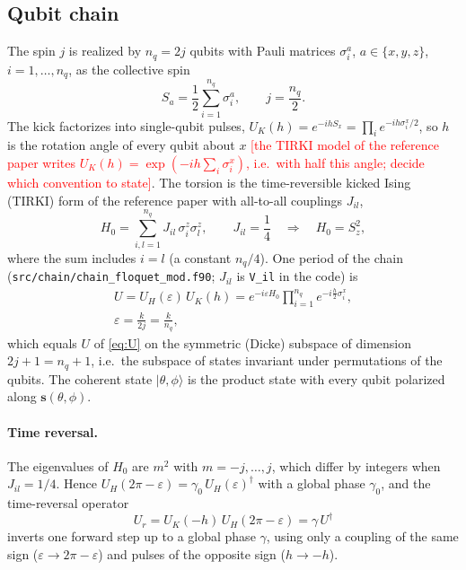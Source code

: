 \documentclass[aps,pra,twocolumn,superscriptaddress,nofootinbib]{revtex4-2}
\newcommand{\PH}[1]{\textcolor{red}{[\textsf{#1}]}}
\newcommand{\nq}{n_q}                      %
\begin{document}
\subsection{Qubit chain}\label{sec:chain}

The spin $j$ is realized by $\nq=2j$ qubits with Pauli matrices $\sigma^a_i$, $a\in\{x,y,z\}$, $i=1,\dots,\nq$, as
the collective spin
\begin{equation}\label{eq:Jq}
  S_a = \frac12\sum_{i=1}^{\nq}\sigma^a_i ,\qquad j=\frac{\nq}{2}.
\end{equation}
The kick factorizes into single-qubit pulses, $U_K(h)=e^{-ihS_x}=\prod_i e^{-ih\sigma^x_i/2}$, so $h$ is the
rotation angle of every qubit about $x$ \PH{the TIRKI model of the reference paper writes
$U_K(h)=\exp(-ih\sum_i\sigma^x_i)$, i.e.\ with half this angle; decide which convention to state}. The torsion is the
time-reversible kicked Ising (TIRKI) form of the reference paper with all-to-all couplings $J_{il}$,
\begin{equation}\label{eq:Hzz}
  H_0 = \sum_{i,l=1}^{\nq}J_{il}\,\sigma^z_i\sigma^z_l ,\qquad J_{il}=\frac14
  \quad\Rightarrow\quad H_0=S_z^2 ,
\end{equation}
where the sum includes $i=l$ (a constant $\nq/4$). One period of the chain (\texttt{src/chain/chain\_floquet\_mod.f90};
$J_{il}$ is \texttt{V\_il} in the code) is
\begin{equation}\label{eq:Uc}
  \begin{gathered}
  U = U_H(\varepsilon)\,U_K(h) = e^{-i\varepsilon H_0}\prod_{i=1}^{\nq}e^{-i\frac h2\sigma^x_i},\\
  \varepsilon=\frac{k}{2j}=\frac{k}{\nq},
  \end{gathered}
\end{equation}
which equals $U$ of \cref{eq:U} on the symmetric (Dicke) subspace of dimension $2j+1=\nq+1$, i.e.\ the
subspace of states invariant under permutations of the qubits. The coherent state $|\theta,\phi\rangle$ is the
product state with every qubit polarized along $\bm s(\theta,\phi)$.

\paragraph{Time reversal.}
The eigenvalues of $H_0$ are $m^2$ with $m=-j,\dots,j$, which differ by integers when $J_{il}=1/4$. Hence
$U_H(2\pi-\varepsilon) = \gamma_0\,U_H(\varepsilon)^{\dagger}$ with a global phase $\gamma_0$, and the time-reversal
operator
\begin{equation}\label{eq:Ub}
  U_r = U_K(-h)\,U_H(2\pi-\varepsilon) = \gamma\,U^{\dagger}
\end{equation}
inverts one forward step up to a global phase $\gamma$, using only a coupling of the same sign ($\varepsilon\to
2\pi-\varepsilon$) and pulses of the opposite sign ($h\to-h$).
\end{document}
